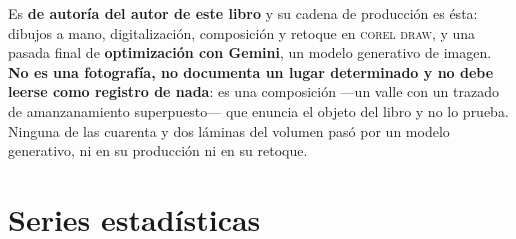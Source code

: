 Es \textbf{de autoría del autor de este libro} y su cadena de producción es ésta: dibujos a mano,
digitalización, composición y retoque en \textsc{corel draw}, y una pasada final de
\textbf{optimización con Gemini}, un modelo generativo de imagen. \textbf{No es una fotografía,
no documenta un lugar determinado y no debe leerse como registro de nada}: es una composición
---un valle con un trazado de amanzanamiento superpuesto--- que enuncia el objeto del libro y no
lo prueba. Ninguna de las cuarenta y dos láminas del volumen pasó por un modelo generativo, ni
en su producción ni en su retoque.

\section{Series estadísticas}

